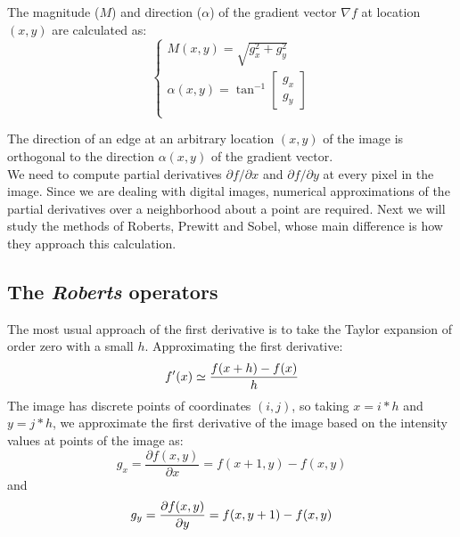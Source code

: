 \documentclass{ipol}
\numberwithin{equation}{section}
\numberwithin{table}{section}
\begin{document}
The magnitude ($M$) and direction ($\alpha$) of the gradient vector $\nabla f$ at location $(x,y)$
are calculated as:
\begin{equation}
	\begin{cases}
		M(x,y) = \sqrt{g_x^2 + g_y^2} \\
		\alpha(x,y) = \tan^{-1} \begin{bmatrix} g_x \\ g_y \end{bmatrix} \\
	\end{cases}
\end{equation}

The direction of an edge at an arbitrary location $(x,y)$ of the image is 
orthogonal to the direction $\alpha(x,y)$ of the gradient vector.\\

We need to compute partial derivatives $\partial f/\partial x$ and $\partial f/\partial y$ 
at every pixel in the image. Since we are dealing with digital images, numerical approximations 
of the partial derivatives over a neighborhood about a point are required. Next we will study 
the methods of Roberts, Prewitt and Sobel, whose main difference is how they approach this calculation.\\

\subsection{The \textit{Roberts} operators}

The most usual approach of the first derivative is to take the Taylor expansion of order zero with
a small $h$. Approximating the first derivative:
\begin{equation}
	f'(x) \simeq \frac{f(x+h) - f(x)}{h}\\
\end{equation}
The image has discrete points of coordinates $(i,j)$, so taking $x=i*h$ and $y=j*h$, we approximate the 
first derivative of the image based on the intensity values ​​at points of the image as:
\begin{equation}
\label{eq:roberts1}
	g_x = \frac{\partial f(x,y)}{\partial x} = f(x+1,y) - f(x,y)
\end{equation}
and
\begin{equation}
\label{eq:roberts2}
	g_y = \frac{\partial f(x,y)}{\partial y} = f(x,y+1) - f(x,y)\\
\end{equation}
\end{document}
